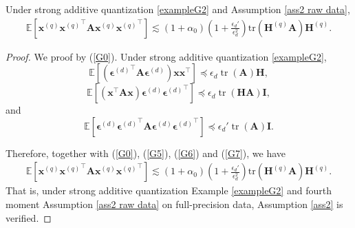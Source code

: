 \documentclass[11pt, letterpaper]{article}
\begin{document}
\begin{lemma}
    Under strong additive quantization \ref{exampleG2} and Assumption \ref{ass2 raw data},
    \begin{equation*}
        \begin{aligned}
            \mathbb{E}\left[{\mathbf{x}^{(q)}}{\mathbf{x}^{(q)}}^\top\mathbf{A}{\mathbf{x}^{(q)}}{\mathbf{x}^{(q)}}^\top\right]\lesssim(1+\alpha_0)\left(1+\frac{\epsilon_d'}{\epsilon_d^2}\right)\mathrm{tr}(\mathbf{H}^{(q)}\mathbf{A})\mathbf{H}^{(q)}.
        \end{aligned}
    \end{equation*}
\end{lemma}
\begin{proof}
    We proof by (\ref{G0}). Under strong additive quantization \ref{exampleG2},
    \begin{equation}
        \label{G5}
        \mathbb{E}\left[\left({\boldsymbol{\epsilon}^{(d)}}^\top\mathbf{A}{\boldsymbol{\epsilon}^{(d)}}\right){\mathbf{x}}{\mathbf{x}}^\top\right]\preceq \epsilon_d\operatorname{tr}(\mathbf{A})\mathbf{H},
    \end{equation}
    \begin{equation}
        \label{G6}
        \mathbb{E}\left[\left({\mathbf{x}}^\top\mathbf{A}{\mathbf{x}}\right)\boldsymbol{\epsilon}^{(d)}{\boldsymbol{\epsilon}^{(d)}}^\top\right]\preceq \epsilon_d\operatorname{tr}(\mathbf{H}\mathbf{A})\mathbf{I},
    \end{equation}
    and
    \begin{equation}
        \label{G7}
        \mathbb{E}\left[\boldsymbol{\epsilon}^{(d)}{\boldsymbol{\epsilon}^{(d)}}^\top\mathbf{A}\boldsymbol{\epsilon}^{(d)}{\boldsymbol{\epsilon}^{(d)}}^\top\right]\preceq\epsilon_d'\operatorname{tr}(\mathbf{A})\mathbf{I}.
    \end{equation}
    
    Therefore, together with (\ref{G0}), (\ref{G5}), (\ref{G6}) and (\ref{G7}), we have
    \begin{equation*}
        \begin{aligned}
            \mathbb{E}\left[{\mathbf{x}^{(q)}}{\mathbf{x}^{(q)}}^\top\mathbf{A}{\mathbf{x}^{(q)}}{\mathbf{x}^{(q)}}^\top\right]\lesssim(1+\alpha_0)\left(1+\frac{\epsilon_d'}{\epsilon_d^2}\right)\mathrm{tr}(\mathbf{H}^{(q)}\mathbf{A})\mathbf{H}^{(q)}.
        \end{aligned}
    \end{equation*}
    That is, under strong additive quantization Example \ref{exampleG2} and fourth moment Assumption \ref{ass2 raw data} on full-precision data, Assumption \ref{ass2} is verified.
\end{proof}
\end{document}
